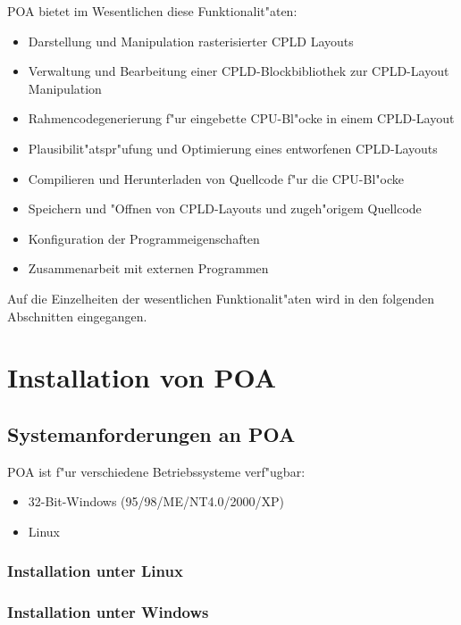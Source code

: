 \documentclass[a4paper,titlepage,12pt,ngerman]{scrbook}
\begin{document}
 POA bietet im Wesentlichen diese Funktionalit"aten:
\begin{itemize}
\item Darstellung und Manipulation rasterisierter CPLD Layouts
\item Verwaltung und Bearbeitung einer CPLD-Blockbibliothek zur CPLD-Layout
      Manipulation
\item Rahmencodegenerierung f"ur eingebette CPU-Bl"ocke in einem CPLD-Layout
\item Plausibilit"atspr"ufung und Optimierung eines entworfenen CPLD-Layouts
\item Compilieren und Herunterladen von Quellcode f"ur die CPU-Bl"ocke
\item Speichern und "Offnen von CPLD-Layouts und zugeh"origem Quellcode
\item Konfiguration der Programmeigenschaften
\item Zusammenarbeit mit externen Programmen
\end{itemize}
Auf die Einzelheiten der wesentlichen Funktionalit"aten wird in den folgenden Abschnitten eingegangen.



\chapter{Installation von POA}

\section{Systemanforderungen an POA}
POA ist f"ur verschiedene Betriebssysteme verf"ugbar:
\begin{itemize}
\item 32-Bit-Windows (95/98/ME/NT4.0/2000/XP)
\item Linux
\end{itemize}


\subsection{Installation unter Linux}
	
\subsection{Installation unter Windows}


	
\end{document}
